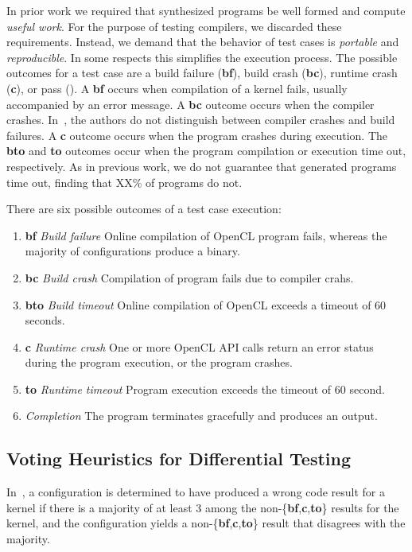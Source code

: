 In prior work we required that synthesized programs be well formed and compute \emph{useful work}. For the purpose of testing compilers, we discarded these requirements. Instead, we demand that the behavior of test cases is \emph{portable} and \emph{reproducible}. In some respects this simplifies the execution process. The possible outcomes for a test case are a build failure (\textbf{bf}), build crash (\textbf{bc}), runtime crash (\textbf{c}), or pass (\textbf{\cmark}). A \textbf{bf} occurs when compilation of a kernel fails, usually accompanied by an error message. A \textbf{bc} outcome occurs when the compiler crashes. In~\cite{Lidbury2015a}, the authors do not distinguish between compiler crashes and build failures. A \textbf{c} outcome occurs when the program crashes during execution. The \textbf{bto} and \textbf{to} outcomes occur when the program compilation or execution time out, respectively. As in previous work, we do not guarantee that generated programs time out, finding that XX\% of programs do not.

There are six possible outcomes of a test case execution:
%
\begin{enumerate}
	\item \textbf{bf} \emph{Build failure} Online compilation of OpenCL program fails, whereas the majority of configurations produce a binary.
	\item \textbf{bc} \emph{Build crash} Compilation of program fails due to compiler crahs.
	\item \textbf{bto} \emph{Build timeout} Online compilation of OpenCL exceeds a timeout of 60 seconds.
	\item \textbf{c} \emph{Runtime crash} One or more OpenCL API calls return an error status during the program execution, or the program crashes.
	\item \textbf{to} \emph{Runtime timeout} Program execution exceeds the timeout of 60 second.
	\item \textbf{\cmark} \emph{Completion} The program terminates gracefully and produces an output.
\end{enumerate}


\subsection{Voting Heuristics for Differential Testing}

In~\cite{Lidbury2015a}, a configuration is determined to have produced a wrong code result for a kernel if there is a majority of at least 3 among the non-\{\textbf{bf},\textbf{c},\textbf{to}\} results for the kernel, and the configuration yields a non-\{\textbf{bf},\textbf{c},\textbf{to}\} result that disagrees with the majority.


